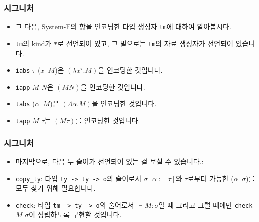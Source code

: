\documentclass[slidestop,compress,mathserif]{beamer}
\begin{document}
    \begin{frame}
        \frametitle{시그니처}
        \begin{itemize}
            \item 그 다음, System-F의 항을 인코딩한 타입 생성자 \texttt{tm}에 대하여 알아봅시다.
            \item \texttt{tm}의 kind가 \texttt{*}로 선언되어 있고, 그 밑으로는 \texttt{tm}의 자료 생성자가 선언되어 있습니다.
            \item \texttt{iabs} $\tau$ ($x$\texttt{\string\ }$M$)은 $\left( \lambda x^{\tau} . M \right)$을 인코딩한 것입니다.
            \item \texttt{iapp} $M$ $N$은 $\left( M N \right)$을 인코딩한 것입니다.
            \item \texttt{tabs} ($\alpha$\texttt{\string\ }$M$)은 $\left( \Lambda \alpha . M \right)$을 인코딩한 것입니다.
            \item \texttt{tapp} $M$ $\tau$는 $\left( M \tau \right)$를 인코딩한 것입니다.
        \end{itemize}
    \end{frame}

    \begin{frame}
        \frametitle{시그니처}
        \begin{itemize}
            \item 마지막으로, 다음 두 술어가 선언되어 있는 걸 보실 수 있습니다.:
            \item \texttt{copy\_ty}: 타입 \texttt{ty -> ty -> o}의 술어로서 $\sigma \left[ \alpha := \tau \right]$와 $\tau$로부터 가능한 ($\alpha$\texttt{\string\ }$\sigma$)를 모두 찾기 위해 필요합니다.
            \item \texttt{check}: 타입 \texttt{tm -> ty -> o}의 술어로서 $\vdash M : \sigma$일 때 그리고 그럴 때에만 \texttt{check} $M$ $\sigma$이 성립하도록 구현할 것입니다.
        \end{itemize}
    \end{frame}
\end{document}
